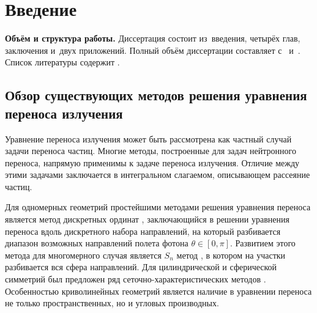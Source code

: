 \chapter*{Введение}							%



\textbf{Объём и структура работы.} Диссертация состоит из~введения, четырёх глав, заключения и~двух приложений.
%
Полный объём диссертации составляет  
с~
и~. Список литературы содержит  
.

\section*{Обзор существующих методов решения уравнения переноса излучения}

Уравнение переноса излучения может быть рассмотрена как частный случай задачи переноса частиц. Многие методы, построенные для задач нейтронного переноса, напрямую применимы к задаче переноса излучения. Отличие между этими задачами заключается в интегральном слагаемом, описывающем рассеяние частиц.

Для одномерных геометрий простейшими методами решения уравнения переноса является метод дискретных ординат \cite{Wick1943,Chandrasekar1950}, заключающийся в решении уравнения переноса вдоль дискретного набора направлений, на который разбивается диапазон возможных направлений полета фотона $\theta \in [0, \pi]$. Развитием этого метода для многомерного случая является $S_n$ метод \cite{Carlson1953,Lathrop1965}, в котором на участки разбивается вся сфера направлений.
Для цилиндрической и сферической симметрий был предложен ряд сеточно-характеристических методов \cite{Vladimirov1958,Goldin1960}. Особенностью криволинейных геометрий является наличие в уравнении переноса не только пространственных, но и угловых производных.

